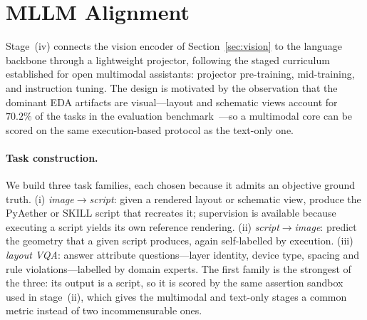 ﻿%
\section{MLLM Alignment}\label{sec:mllm}

Stage~(iv) connects the vision encoder of Section~\ref{sec:vision} to the language backbone through a lightweight projector, following the staged curriculum established for open multimodal assistants: projector pre-training, mid-training, and instruction tuning.
The design is motivated by the observation that the dominant EDA artifacts are visual---layout and schematic views account for $70.2\%$ of the tasks in the evaluation benchmark~\cite{liu2026zhulong}---so a multimodal core can be scored on the same execution-based protocol as the text-only one.

\paragraph{Task construction.}
We build three task families, each chosen because it admits an objective ground truth.
(i) \emph{image$\to$script}: given a rendered layout or schematic view, produce the PyAether or SKILL script that recreates it; supervision is available because executing a script yields its own reference rendering.
(ii) \emph{script$\to$image}: predict the geometry that a given script produces, again self-labelled by execution.
(iii) \emph{layout VQA}: answer attribute questions---layer identity, device type, spacing and rule violations---labelled by domain experts.
The first family is the strongest of the three: its output is a script, so it is scored by the same assertion sandbox used in stage~(ii), which gives the multimodal and text-only stages a common metric instead of two incommensurable ones.

